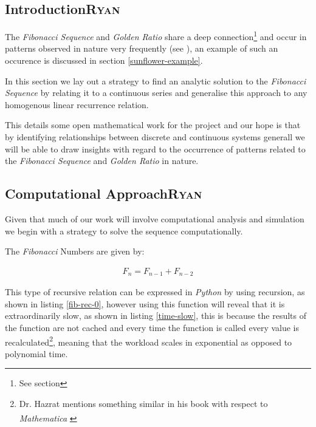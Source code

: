\documentclass[a4paper,11pt,twoside]{article}
\begin{document}
\subsection{Introduction\hfill{}\textsc{Ryan}}
\label{sec:orgeb4c7c8}
The \emph{Fibonacci Sequence} and \emph{Golden Ratio} share a deep connection\footnote{See section} and occur in patterns observed in nature very frequently
(see
\cite{shellyallenFibonacciNature,benedettapalazzoNumbersNatureFibonacci2016,MinarovaNikoletta2014TFSN,NatureGoldenRatio2018,robertlambHowAreFibonacci2008,ronknottFibonacciNumbersGolden2016}), an example of such an occurence is discussed in section \ref{sunflower-example}.


In this section we lay out a strategy to find an analytic solution to the
\emph{Fibonacci Sequence} by relating it to a continuous series and generalise this
approach to any homogenous linear recurrence relation.

This details some open mathematical work for the project and our hope is that by
identifying relationships between discrete and continuous systems generall we
will be able to draw insights with regard to the occurrence of patterns related
to the \emph{Fibonacci Sequence} and \emph{Golden Ratio} in nature.

\subsection{Computational Approach\hfill{}\textsc{Ryan}}
\label{define-the-fibonacci-numbers}
Given that much of our work will involve computational analysis and simulation we begin with a strategy to solve the sequence computationally.

The \emph{Fibonacci} Numbers are given by:

\begin{align}
F_n = F_{n-1} + F_{n-2} \label{eq:fib-def}
\end{align}

This type of recursive relation can be expressed in \emph{Python} by using recursion,
as shown in listing \ref{fib-rec-0}, however using this function will reveal that it
is extraordinarily slow, as shown in listing \ref{time-slow}, this is because the
results of the function are not cached and every time the function is called
every value is recalculated\footnote{Dr. Hazrat mentions something similar in his book with respect to
\emph{Mathematica}\textsuperscript{\textregistered}
\cite[Ch. 13]{hazratMathematicaProblemCenteredApproach2015}}, meaning that the workload scales in
exponential as opposed to polynomial time.
\end{document}

